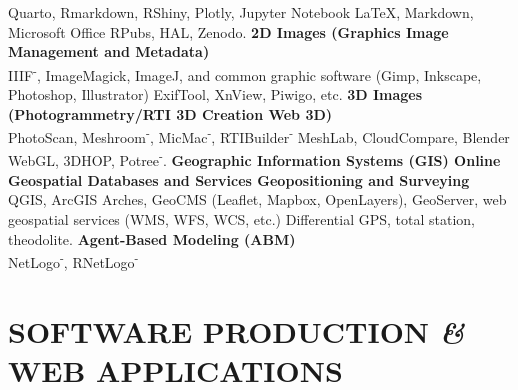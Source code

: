 \documentclass{article}
\newcommand{\fr}[1]{} %
\newcommand{\en}[1]{#1}   %
\begin{document}
\en{\textsf{Quarto}, \textsf{Rmarkdown}, \textsf{RShiny}, \textsf{Plotly}, \textsf{Jupyter Notebook} \textbf{{\textbar}} \LaTeX, \textsf{Markdown}, Microsoft Office \textbf{{\textbar}} RPubs, HAL, Zenodo.}
\smallbreak
\textbf{\fr{Images 2D (Infographie {\textbar} Gestion et métadonnées des images)}\en{2D Images (Graphics {\textbar} Image Management and Metadata)}} \\
\fr{IIIF\textsuperscript{-}, ImageMagick, ImageJ, et logiciels graphiques courants (Gimp, Inkscape, Photoshop, Illustrator) {\textbar} ExifTool, XnView, Piwigo, etc.}
\en{IIIF\textsuperscript{-}, ImageMagick, ImageJ, and common graphic software (Gimp, Inkscape, Photoshop, Illustrator) {\textbar} ExifTool, XnView, Piwigo, etc.}
\smallbreak
\textbf{\fr{Images 3D (Photogrammétrie/RTI {\textbar} Création 3D {\textbar} Web 3D)}\en{3D Images (Photogrammetry/RTI {\textbar} 3D Creation {\textbar} Web 3D)}} \\
\fr{PhotoScan, Meshroom\textsuperscript{-}, MicMac\textsuperscript{-}, RTIBuilder\textsuperscript{-} {\textbar} MeshLab, CloudCompare, Blender \textbf{{\textbar}} WebGL, 3DHOP, Potree\textsuperscript{-}.}
\en{PhotoScan, Meshroom\textsuperscript{-}, MicMac\textsuperscript{-}, RTIBuilder\textsuperscript{-} {\textbar} MeshLab, CloudCompare, Blender \textbf{{\textbar}} WebGL, 3DHOP, Potree\textsuperscript{-}.}
\smallbreak
\textbf{\fr{Systèmes d'information géographique (SIG) {\textbar} Bases de données et services géospatiaux en ligne {\textbar} Géopositionnement et topographie}\en{Geographic Information Systems (GIS) {\textbar} Online Geospatial Databases and Services {\textbar} Geopositioning and Surveying}} \\
\fr{QGIS, ArcGIS {\textbar} Arches, GeoCMS (\textsf{Leaflet}, \textsf{Mapbox}, \textsf{OpenLayers}), GeoServer, services géospatiaux web (WMS, WFS, WCS, etc.) {\textbar} GPS différentiel, station totale, théodolite.}
\en{QGIS, ArcGIS {\textbar} Arches, GeoCMS (\textsf{Leaflet}, \textsf{Mapbox}, \textsf{OpenLayers}), GeoServer, web geospatial services (WMS, WFS, WCS, etc.) {\textbar} Differential GPS, total station, theodolite.}
\smallbreak
\textbf{\fr{Modélisation basée sur les agents (ABM)}\en{Agent-Based Modeling (ABM)}} \\
\fr{NetLogo\textsuperscript{-}, \textsf{RNetLogo\textsuperscript{-}}}
\en{NetLogo\textsuperscript{-}, \textsf{RNetLogo\textsuperscript{-}}}
\smallbreak


\section{\fr{PRODUCTION LOGICIELLE \textit{\&} APPLICATIONS WEB}\en{SOFTWARE PRODUCTION \textit{\&} WEB APPLICATIONS}}
\end{document}
